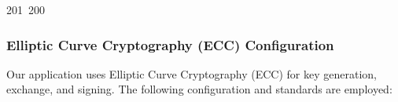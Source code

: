 201~200~\documentclass{article}
\begin{document}
	                                                                                                                                                                                                                                                                                                	                                                                                                                                        	    	                                                                                                	                                                                                                                                                                                                                                                                                                                                	                                                                        	                                                                        	                                                                                                                                        	                                                                                                                                                \subsubsection{Elliptic Curve Cryptography (ECC) Configuration}

	                                                                                                                                                                                                                                                                                                	                                                                                                                                        	    	                                                                                                	                                                                                                                                                                                                                                                                                                                                	                                                                        	                                                                        	                                                                                                                                        	                                                                                                                                                Our application uses Elliptic Curve Cryptography (ECC) for key generation, exchange, and signing. The following configuration and standards are employed:
\end{document}
